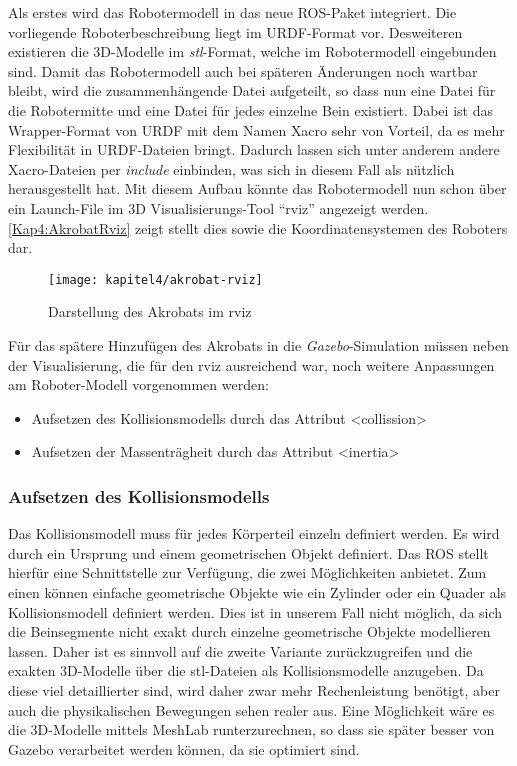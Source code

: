 \begin{itemize}
Als erstes wird das Robotermodell in das neue \ac{ROS}-Paket integriert. Die vorliegende Roboterbeschreibung liegt im \ac{URDF}-Format vor. Desweiteren existieren die 3D-Modelle im \emph{stl}-Format, welche im Robotermodell eingebunden sind. Damit das Robotermodell auch bei späteren Änderungen noch wartbar bleibt, wird die zusammenhängende Datei aufgeteilt, so dass nun eine Datei für die Robotermitte und eine Datei für jedes einzelne Bein existiert. Dabei ist das Wrapper-Format von \ac{URDF} mit dem Namen \ac{Xacro} sehr von Vorteil, da es mehr Flexibilität in \ac{URDF}-Dateien bringt. Dadurch lassen sich unter anderem andere \ac{Xacro}-Dateien per \emph{include} einbinden, was sich in diesem Fall als nützlich herausgestellt hat. Mit diesem Aufbau könnte das Robotermodell nun schon über ein Launch-File im 3D Visualisierungs-Tool "`rviz"' angezeigt werden. \autoref{Kap4:AkrobatRviz} zeigt stellt dies sowie die Koordinatensystemen des Roboters dar.

\begin{figure}[b!]
  \centering
  \texttt{[image: kapitel4/akrobat-rviz]}
  \caption{Darstellung des Akrobats im rviz}
  \label{Kap4:AkrobatRviz}
\end{figure}

Für das spätere Hinzufügen des Akrobats in die \emph{Gazebo}-Simulation müssen neben der Visualisierung, die für den rviz ausreichend war, noch weitere Anpassungen am Roboter-Modell vorgenommen werden:
\begin{itemize}
  \item Aufsetzen des Kollisionsmodells durch das Attribut <collission>
  \item Aufsetzen der Massenträgheit durch das Attribut <inertia>
\end{itemize}

\subsubsection{Aufsetzen des Kollisionsmodells}

Das Kollisionsmodell muss für jedes Körperteil einzeln definiert werden. Es wird durch ein Ursprung und einem geometrischen Objekt definiert. Das \ac{ROS} stellt hierfür eine Schnittstelle zur Verfügung, die zwei Möglichkeiten anbietet. Zum einen können einfache geometrische Objekte wie ein Zylinder oder ein Quader als Kollisionsmodell definiert werden. Dies ist in unserem Fall nicht möglich, da sich die Beinsegmente nicht exakt durch einzelne geometrische Objekte modellieren lassen. Daher ist es sinnvoll auf die zweite Variante zurückzugreifen und die exakten 3D-Modelle über die stl-Dateien als Kollisionsmodelle anzugeben. Da diese viel detaillierter sind, wird daher zwar mehr Rechenleistung benötigt, aber auch die physikalischen Bewegungen sehen realer aus. Eine Möglichkeit wäre es die 3D-Modelle mittels MeshLab \autocite{LocalChapterEvents:ItalChap:ItalianChapConf2008:129-136} runterzurechnen, so dass sie später besser von Gazebo verarbeitet werden können, da sie optimiert sind.


\end{itemize}
